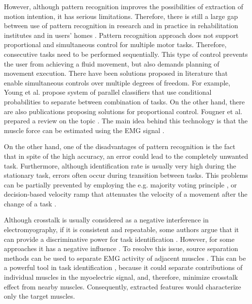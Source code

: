 However, although pattern recognition improves the possibilities of extraction of motion intention, it has serious limitations. Therefore, there is still a large gap between use of pattern recognition in research and in practice in rehabilitation institutes and in users' homes \citep{Jiang2012}. Pattern recognition approach does not support proportional and simultaneous control for multiple motor tasks. Therefore, consecutive tasks need to be performed sequentially. This type of control prevents the user from achieving a fluid movement, but also demands planning of movement execution. There have been solutions proposed in literature that enable simultaneous controls over multiple degrees of freedom. For example, Young et al. \citep{Young2013} propose system of parallel classifiers that use conditional probabilities to separate between combination of tasks. On the other hand, there are also publications proposing solutions for proportional control. Fougner et al. prepared a review on the topic \citep{Fougner2012}. The main idea behind this technology is that the muscle force can be estimated using the EMG signal \citep{Staudenmann2010}. 

On the other hand, one of the disadvantages of pattern recognition is the fact that in spite of the high accuracy, an error could lead to the completely unwanted task. Furthermore, although identification rate is usually very high during the stationary task, errors often occur during transition between tasks. This problems can be partially prevented by employing the e.g. majority voting principle \citep{Englehart2003}, or decision-based velocity ramp that attenuates the velocity of a movement after the change of a task \citep{Simon2011}. %

Although crosstalk is usually considered as a negative interference in electromyography, if it is consistent and repeatable, some authors argue that it can provide a discriminative power for task identification \citep{Farina2014}. However, for some approaches it has a negative influence \citep{He2015}. To resolve this issue, source separation methods can be used to separate EMG activity of adjacent muscles \citep{Farina2004, Holobar2014}. This can be a powerful tool in task identification \citep{Naik2007}, because it could separate contributions of individual muscles in the myoelectric signal, and, therefore, minimize crosstalk effect from nearby muscles. Consequently, extracted features would characterize only the target muscles.


